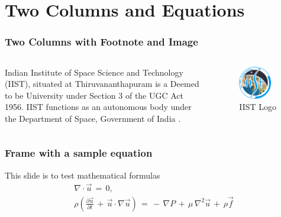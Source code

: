\documentclass[aspectratio=169]{beamer}
\begin{document}
\section{Two Columns and Equations}
\begin{frame}
\frametitle{Two Columns with Footnote and Image}

\begin{columns}

Indian Institute of Space Science and Technology (IIST), situated at Thiruvananthapuram is a Deemed to be University under Section 3 of the UGC Act 1956. IIST functions as an autonomous body under the Department of Space, Government of India \footnotemark[1]. 

\begin{figure}
  \includegraphics[width=0.8\textwidth]{figures/Indian_Institute_of_Space_Science_and_Technology_Logo.png}
  \caption{IIST Logo}
  \label{fig:iistlogo}
\end{figure}
\end{columns}
\end{frame}

\begin{frame}
  \frametitle{Frame with a sample equation}
  This slide is to test mathematical formulas \pause
  \begin{equation}
    \begin{gathered}
        \nabla \cdot \vec{u}\, = \,0,\\
        \rho\left(\frac{\partial\vec{u}}{\partial t} \,+\,\vec{u} \cdot \nabla \vec{u}\right)\, =\, -\, \nabla P\, + \,\mu \,\nabla^2 \vec{u}\, +\, \rho\vec{f}
    \end{gathered}
  \end{equation}
\end{frame}
\end{document}
